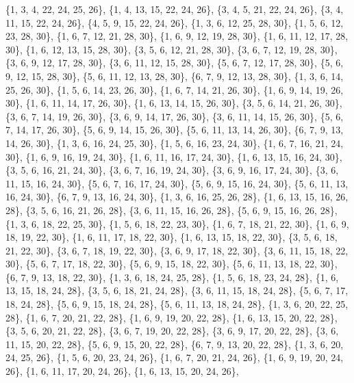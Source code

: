 \documentclass[11pt,a4paper]{article}
\begin{document}
{\{1, 3, 4, 22, 24, 25, 26\}, \{1, 4, 13, 15, 22, 24, 26\}, \{3, 4, 5, 21, 22, 24, 26\}, \{3, 4, 11, 15, 22, 24, 26\}, \{4, 5, 9, 15, 22, 24, 26\},
\{1, 3, 6, 12, 25, 28, 30\}, \{1, 5, 6, 12, 23, 28, 30\}, \{1, 6, 7, 12, 21, 28, 30\}, \{1, 6, 9, 12, 19, 28, 30\}, \{1, 6, 11, 12, 17, 28, 30\},
\{1, 6, 12, 13, 15, 28, 30\}, \{3, 5, 6, 12, 21, 28, 30\}, \{3, 6, 7, 12, 19, 28, 30\}, \{3, 6, 9, 12, 17, 28, 30\}, \{3, 6, 11, 12, 15, 28, 30\},
\{5, 6, 7, 12, 17, 28, 30\}, \{5, 6, 9, 12, 15, 28, 30\}, \{5, 6, 11, 12, 13, 28, 30\}, \{6, 7, 9, 12, 13, 28, 30\}, \{1, 3, 6, 14, 25, 26, 30\},
\{1, 5, 6, 14, 23, 26, 30\}, \{1, 6, 7, 14, 21, 26, 30\}, \{1, 6, 9, 14, 19, 26, 30\}, \{1, 6, 11, 14, 17, 26, 30\}, \{1, 6, 13, 14, 15, 26, 30\},
\{3, 5, 6, 14, 21, 26, 30\}, \{3, 6, 7, 14, 19, 26, 30\}, \{3, 6, 9, 14, 17, 26, 30\}, \{3, 6, 11, 14, 15, 26, 30\}, \{5, 6, 7, 14, 17, 26, 30\},
\{5, 6, 9, 14, 15, 26, 30\}, \{5, 6, 11, 13, 14, 26, 30\}, \{6, 7, 9, 13, 14, 26, 30\}, \{1, 3, 6, 16, 24, 25, 30\}, \{1, 5, 6, 16, 23, 24, 30\},
\{1, 6, 7, 16, 21, 24, 30\}, \{1, 6, 9, 16, 19, 24, 30\}, \{1, 6, 11, 16, 17, 24, 30\}, \{1, 6, 13, 15, 16, 24, 30\}, \{3, 5, 6, 16, 21, 24, 30\},
\{3, 6, 7, 16, 19, 24, 30\}, \{3, 6, 9, 16, 17, 24, 30\}, \{3, 6, 11, 15, 16, 24, 30\}, \{5, 6, 7, 16, 17, 24, 30\}, \{5, 6, 9, 15, 16, 24, 30\},
\{5, 6, 11, 13, 16, 24, 30\}, \{6, 7, 9, 13, 16, 24, 30\}, \{1, 3, 6, 16, 25, 26, 28\}, \{1, 6, 13, 15, 16, 26, 28\}, \{3, 5, 6, 16, 21, 26, 28\},
\{3, 6, 11, 15, 16, 26, 28\}, \{5, 6, 9, 15, 16, 26, 28\}, \{1, 3, 6, 18, 22, 25, 30\}, \{1, 5, 6, 18, 22, 23, 30\}, \{1, 6, 7, 18, 21, 22, 30\},
\{1, 6, 9, 18, 19, 22, 30\}, \{1, 6, 11, 17, 18, 22, 30\}, \{1, 6, 13, 15, 18, 22, 30\}, \{3, 5, 6, 18, 21, 22, 30\}, \{3, 6, 7, 18, 19, 22, 30\},
\{3, 6, 9, 17, 18, 22, 30\}, \{3, 6, 11, 15, 18, 22, 30\}, \{5, 6, 7, 17, 18, 22, 30\}, \{5, 6, 9, 15, 18, 22, 30\}, \{5, 6, 11, 13, 18, 22, 30\},
\{6, 7, 9, 13, 18, 22, 30\}, \{1, 3, 6, 18, 24, 25, 28\}, \{1, 5, 6, 18, 23, 24, 28\}, \{1, 6, 13, 15, 18, 24, 28\}, \{3, 5, 6, 18, 21, 24, 28\},
\{3, 6, 11, 15, 18, 24, 28\}, \{5, 6, 7, 17, 18, 24, 28\}, \{5, 6, 9, 15, 18, 24, 28\}, \{5, 6, 11, 13, 18, 24, 28\}, \{1, 3, 6, 20, 22, 25, 28\},
\{1, 6, 7, 20, 21, 22, 28\}, \{1, 6, 9, 19, 20, 22, 28\}, \{1, 6, 13, 15, 20, 22, 28\}, \{3, 5, 6, 20, 21, 22, 28\}, \{3, 6, 7, 19, 20, 22, 28\},
\{3, 6, 9, 17, 20, 22, 28\}, \{3, 6, 11, 15, 20, 22, 28\}, \{5, 6, 9, 15, 20, 22, 28\}, \{6, 7, 9, 13, 20, 22, 28\}, \{1, 3, 6, 20, 24, 25, 26\},
\{1, 5, 6, 20, 23, 24, 26\}, \{1, 6, 7, 20, 21, 24, 26\}, \{1, 6, 9, 19, 20, 24, 26\}, \{1, 6, 11, 17, 20, 24, 26\}, \{1, 6, 13, 15, 20, 24, 26\},
}
\end{document}
